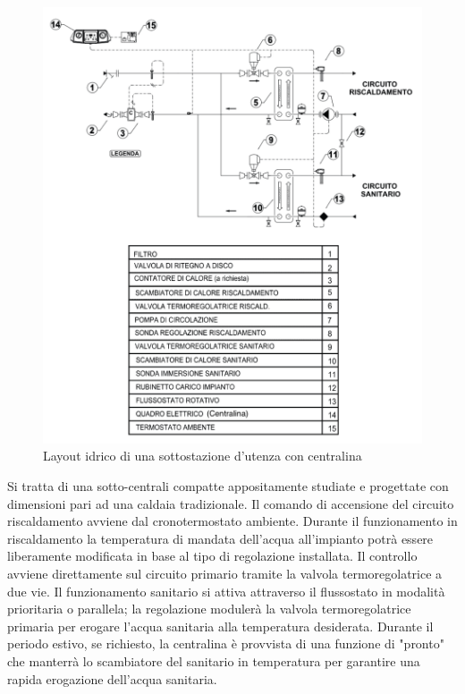 \documentclass[laurea,oneside,11pt]{USiena_tesiLM}
\begin{document}
\begin{figure}[!ht]
\centering
\includegraphics[width=\textwidth]{figure/schema_centralina2} 
\caption{Layout idrico di una sottostazione d'utenza con centralina}
\label{fig:schema_centralina2}
\end{figure}

Si tratta di una sotto-centrali compatte appositamente studiate e progettate con dimensioni pari ad una caldaia tradizionale.
Il comando di accensione del circuito riscaldamento avviene dal cronotermostato ambiente. Durante il funzionamento in riscaldamento la temperatura di mandata dell'acqua all'impianto potrà essere liberamente modificata in base al tipo di regolazione installata. Il controllo  avviene direttamente sul circuito primario tramite la valvola termoregolatrice a due vie.
Il funzionamento sanitario si attiva attraverso il flussostato in modalità prioritaria o parallela; la regolazione modulerà la valvola termoregolatrice primaria per erogare l’acqua sanitaria alla temperatura desiderata.
Durante il periodo estivo, se richiesto, la centralina è provvista di una funzione di "pronto" che manterrà lo scambiatore del sanitario in temperatura per garantire una rapida erogazione dell'acqua sanitaria.
\end{document}
